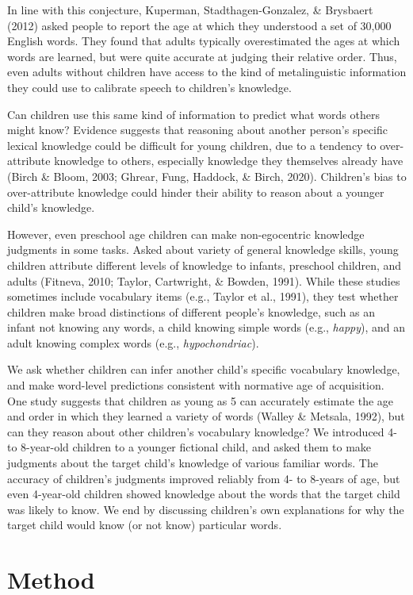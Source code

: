 \documentclass[10pt, letterpaper]{article}
\begin{document}
In line with this conjecture, Kuperman, Stadthagen-Gonzalez, \&
Brysbaert (2012) asked people to report the age at which they understood
a set of 30,000 English words. They found that adults typically
overestimated the ages at which words are learned, but were quite
accurate at judging their relative order. Thus, even adults without
children have access to the kind of metalinguistic information they
could use to calibrate speech to children's knowledge.

Can children use this same kind of information to predict what words
others might know? Evidence suggests that reasoning about another
person's specific lexical knowledge could be difficult for young
children, due to a tendency to over-attribute knowledge to others,
especially knowledge they themselves already have (Birch \& Bloom, 2003;
Ghrear, Fung, Haddock, \& Birch, 2020). Children's bias to
over-attribute knowledge could hinder their ability to reason about a
younger child's knowledge.

However, even preschool age children can make non-egocentric knowledge
judgments in some tasks. Asked about variety of general knowledge
skills, young children attribute different levels of knowledge to
infants, preschool children, and adults (Fitneva, 2010; Taylor,
Cartwright, \& Bowden, 1991). While these studies sometimes include
vocabulary items (e.g., Taylor et al., 1991), they test whether children
make broad distinctions of different people's knowledge, such as an
infant not knowing any words, a child knowing simple words (e.g.,
\emph{happy}), and an adult knowing complex words (e.g.,
\emph{hypochondriac}).

We ask whether children can infer another child's specific vocabulary
knowledge, and make word-level predictions consistent with normative age
of acquisition. One study suggests that children as young as 5 can
accurately estimate the age and order in which they learned a variety of
words (Walley \& Metsala, 1992), but can they reason about other
children's vocabulary knowledge? We introduced 4- to 8-year-old children
to a younger fictional child, and asked them to make judgments about the
target child's knowledge of various familiar words. The accuracy of
children's judgments improved reliably from 4- to 8-years of age, but
even 4-year-old children showed knowledge about the words that the
target child was likely to know. We end by discussing children's own
explanations for why the target child would know (or not know)
particular words.

\hypertarget{method}{%
\section{Method}\label{method}}
\end{document}
